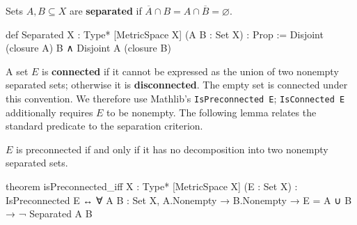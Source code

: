 \begin{definition}
  \label{an1:def:connected-set}
  Sets $A,B\subseteq X$ are \textbf{separated} if $\overline A\cap B=A\cap\overline
    B=\varnothing$.
  \begin{lean}
    def Separated {X : Type*} [MetricSpace X] (A B : Set X) : Prop :=
      Disjoint (closure A) B ∧ Disjoint A (closure B)
  \end{lean}
  A set $E$ is \textbf{connected} if it cannot be expressed as the union of two nonempty separated
  sets; otherwise it is \textbf{disconnected}.
  The empty set is connected under this convention.
  We therefore use Mathlib's \texttt{IsPreconnected E}; \texttt{IsConnected E} additionally
  requires $E$ to be nonempty.
  The following lemma relates the standard predicate to the separation criterion.
\end{definition}

\begin{lemma}
  \label{an1:lem:isPreconnected-iff}
  $E$ is preconnected if and only if it has no decomposition into two nonempty separated sets.

  \begin{lean}
    theorem isPreconnected_iff {X : Type*} [MetricSpace X] (E : Set X) :
        IsPreconnected E ↔
          ∀ A B : Set X, A.Nonempty → B.Nonempty → E = A ∪ B → ¬ Separated A B
  \end{lean}
\end{lemma}

